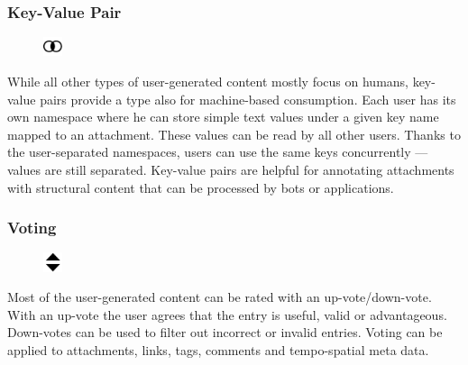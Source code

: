 \documentclass[10pt]{article}
\begin{document}
\subsubsection{Key-Value Pair} 
\begin{figure}
\includegraphics[width=0.05\textwidth]{symbols/combine.pdf}
\end{figure}
While all other types of user-generated content mostly focus on humans, key-value pairs provide a type also for machine-based consumption. Each user has its own namespace where he can store simple text values under a given key name mapped to an attachment. These values can be read by all other users. Thanks to the user-separated namespaces, users can use the same keys concurrently --- values are still separated. Key-value pairs are helpful for annotating attachments with structural content that can be processed by bots or applications.

\subsubsection{Voting} 
\begin{figure}
\includegraphics[width=0.05\textwidth]{symbols/symbol_voting.pdf}
\end{figure}
Most of the user-generated content can be rated with an up-vote/down-vote. With an up-vote the user agrees that the entry is useful, valid or advantageous. Down-votes can be used to filter out incorrect or invalid entries. Voting can be applied to attachments, links, tags, comments and tempo-spatial meta data.
\end{document}

